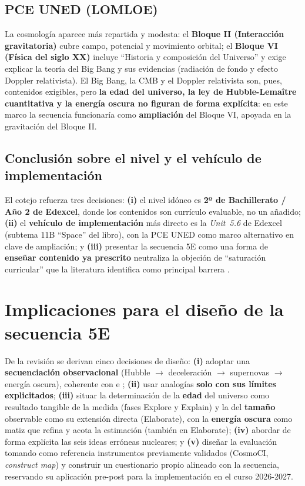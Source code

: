 \subsection{PCE UNED (LOMLOE)}

La cosmología aparece más repartida y modesta: el \textbf{Bloque II (Interacción gravitatoria)} cubre campo, potencial y movimiento orbital; el \textbf{Bloque VI (Física del siglo XX)} incluye ``Historia y composición del Universo'' y exige explicar la teoría del Big Bang y sus evidencias (radiación de fondo y efecto Doppler relativista). El Big Bang, la CMB y el Doppler relativista son, pues, contenidos exigibles, pero \textbf{la edad del universo, la ley de Hubble-Lemaître cuantitativa y la energía oscura no figuran de forma explícita}: en este marco la secuencia funcionaría como \textbf{ampliación} del Bloque VI, apoyada en la gravitación del Bloque II.

\subsection{Conclusión sobre el nivel y el vehículo de implementación}

El cotejo refuerza tres decisiones: \textbf{(i)} el nivel idóneo es \textbf{2º de Bachillerato / Año 2 de Edexcel}, donde los contenidos son currículo evaluable, no un añadido; \textbf{(ii)} el \textbf{vehículo de implementación} más directo es la \textit{Unit~5.6} de Edexcel (subtema 11B ``Space'' del libro), con la PCE UNED como marco alternativo en clave de ampliación; y \textbf{(iii)} presentar la secuencia 5E como una forma de \textbf{enseñar contenido ya prescrito} neutraliza la objeción de ``saturación curricular'' que la literatura identifica como principal barrera \parencite{skolimoski2014,lin2011}.

\section{Implicaciones para el diseño de la secuencia 5E}\label{sec:implicaciones}

De la revisión se derivan cinco decisiones de diseño: \textbf{(i)} adoptar una \textbf{secuenciación observacional} (Hubble $\rightarrow$ deceleración $\rightarrow$ supernovas $\rightarrow$ energía oscura), coherente con \textcite{pimbblet2003} e \textcite{hyde2021}; \textbf{(ii)} usar analogías \textbf{solo con sus límites explicitados}; \textbf{(iii)} situar la determinación de la \textbf{edad} del universo como resultado tangible de la medida (fases Explore y Explain) y la del \textbf{tamaño} observable como su extensión directa (Elaborate), con la \textbf{energía oscura} como matiz que refina y acota la estimación (también en Elaborate); \textbf{(iv)} abordar de forma explícita las seis ideas erróneas nucleares; y \textbf{(v)} diseñar la evaluación tomando como referencia instrumentos previamente validados (CosmoCI, \textit{construct map}) y construir un cuestionario propio alineado con la secuencia, reservando su aplicación pre-post para la implementación en el curso 2026-2027.

